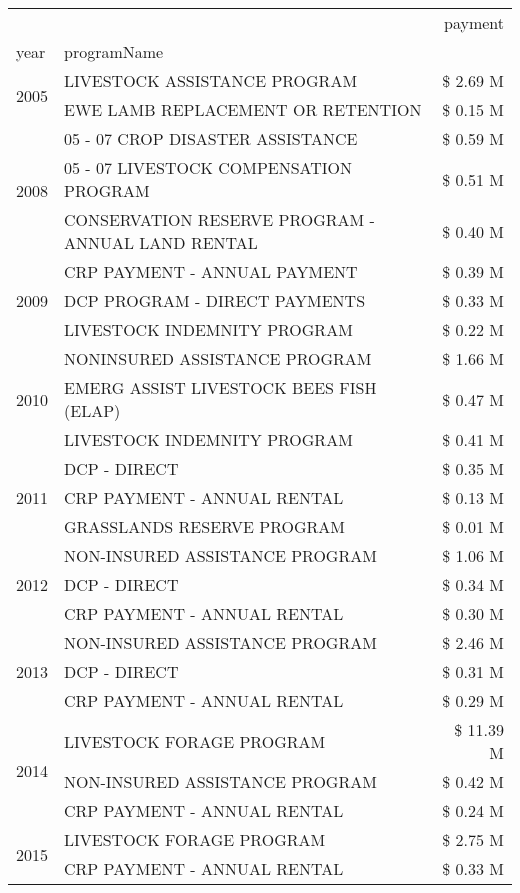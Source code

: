 \begin{tabular}{llr}
\toprule
 &  & payment \\
year & programName &  \\
\midrule
\multirow[t]{2}{*}{2005} & LIVESTOCK ASSISTANCE PROGRAM & \$ 2.69 M \\
 & EWE LAMB REPLACEMENT OR RETENTION & \$ 0.15 M \\
\cline{1-3}
\multirow[t]{3}{*}{2008} & 05 - 07 CROP DISASTER ASSISTANCE & \$ 0.59 M \\
 & 05 - 07 LIVESTOCK COMPENSATION PROGRAM & \$ 0.51 M \\
 & CONSERVATION RESERVE PROGRAM - ANNUAL LAND RENTAL & \$ 0.40 M \\
\cline{1-3}
\multirow[t]{3}{*}{2009} & CRP PAYMENT - ANNUAL PAYMENT & \$ 0.39 M \\
 & DCP PROGRAM - DIRECT PAYMENTS & \$ 0.33 M \\
 & LIVESTOCK INDEMNITY PROGRAM & \$ 0.22 M \\
\cline{1-3}
\multirow[t]{3}{*}{2010} & NONINSURED ASSISTANCE PROGRAM & \$ 1.66 M \\
 & EMERG ASSIST LIVESTOCK BEES FISH (ELAP) & \$ 0.47 M \\
 & LIVESTOCK INDEMNITY PROGRAM & \$ 0.41 M \\
\cline{1-3}
\multirow[t]{3}{*}{2011} & DCP - DIRECT & \$ 0.35 M \\
 & CRP PAYMENT - ANNUAL RENTAL & \$ 0.13 M \\
 & GRASSLANDS RESERVE PROGRAM & \$ 0.01 M \\
\cline{1-3}
\multirow[t]{3}{*}{2012} & NON-INSURED ASSISTANCE PROGRAM & \$ 1.06 M \\
 & DCP - DIRECT & \$ 0.34 M \\
 & CRP PAYMENT - ANNUAL RENTAL & \$ 0.30 M \\
\cline{1-3}
\multirow[t]{3}{*}{2013} & NON-INSURED ASSISTANCE PROGRAM & \$ 2.46 M \\
 & DCP - DIRECT & \$ 0.31 M \\
 & CRP PAYMENT - ANNUAL RENTAL & \$ 0.29 M \\
\cline{1-3}
\multirow[t]{3}{*}{2014} & LIVESTOCK FORAGE PROGRAM & \$ 11.39 M \\
 & NON-INSURED ASSISTANCE PROGRAM & \$ 0.42 M \\
 & CRP PAYMENT - ANNUAL RENTAL & \$ 0.24 M \\
\cline{1-3}
\multirow[t]{3}{*}{2015} & LIVESTOCK FORAGE PROGRAM & \$ 2.75 M \\
 & CRP PAYMENT - ANNUAL RENTAL & \$ 0.33 M \\

\end{tabular}
